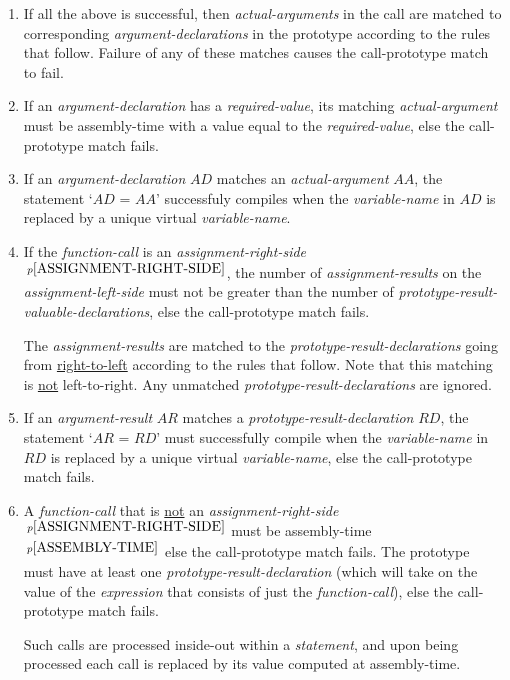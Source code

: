 \documentclass[12pt]{article}
\newcommand{\pagnote}[1]{$\,^{p\pageref{#1}}$}
\begin{document}
\begin{enumerate}
\item If all the above is successful, then {\em actual-arguments}
in the call are matched to corresponding {\em argument-declarations}
in the prototype according to the rules that follow.
Failure of any of these matches causes
the call-prototype match to fail.

\item If an {\em argument-declaration} has a {\em required-value},
its matching {\em actual-argument} must be assembly-time with
a value equal to the {\em required-value}, else the call-prototype
match fails.

\item If an {\em argument-declaration} $AD$ matches an {\em actual-argument}
$AA$, the statement `$AD$ = $AA$' successfuly compiles
when the {\em variable-name} in $AD$ is replaced by a unique virtual
{\em variable-name}.

\item If the {\em function-call} is an
{\em assignment-right-side}\pagnote{ASSIGNMENT-RIGHT-SIDE},
the number of {\em assignment-results} on the
{\em assignment-left-side} must not be greater than the number of
{\em prototype-result-valuable-declarations}, else the call-prototype
match fails.

The {\em assignment-results} are matched to the
{\em prototype-result-declarations} going from \underline{right-to-left}
according to the rules that follow.  Note that
this matching is \underline{not} left-to-right.
Any unmatched {\em prototype-result-declarations}
are ignored.  

\item If an {\em argument-result} $AR$ matches a
{\em prototype-result-declaration} $RD$, the statement `$AR$ = $RD$'
must successfully compile
when the {\em variable-name} in $RD$ is replaced by a unique virtual
{\em variable-name}, else the call-prototype match fails.

\item A {\em function-call} that is \underline{not} an
{\em assignment-right-side}\pagnote{ASSIGNMENT-RIGHT-SIDE}
must be assembly-time\pagnote{ASSEMBLY-TIME} else the
call-prototype match fails.
The prototype must
have at least one {\em prototype-result-declaration} (which
will take on the value of the {\em expression} that consists of
just the {\em function-call}), else the
call-prototype match fails.

Such calls are processed inside-out within a {\em statement},
and upon being processed each call is replaced by its value computed
at assembly-time.

\end{enumerate}
\end{document}
